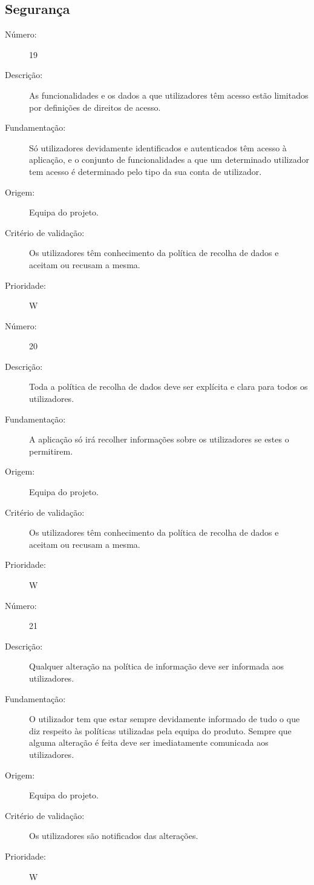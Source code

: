 \documentclass{article}
\begin{document}
  \subsection{Segurança}

            \begin{description}
        \item[Número:]19
        \item[Descrição:]As funcionalidades e os dados a que utilizadores têm acesso estão limitados por definições de direitos de acesso.
        \item[Fundamentação:]Só utilizadores devidamente identificados e autenticados têm acesso à aplicação, e o conjunto de funcionalidades a que um determinado utilizador tem acesso é determinado pelo tipo da sua conta de utilizador.
        \item[Origem:]Equipa do projeto.
        \item[Critério de validação:]Os utilizadores têm conhecimento da política de recolha de dados e aceitam ou recusam a mesma.
        \item[Prioridade:]W
      \end{description}
      \vspace{0.5cm}

            \begin{description}
        \item[Número:]20
        \item[Descrição:]Toda a política de recolha de dados deve ser explícita e clara para todos os utilizadores.
        \item[Fundamentação:]A aplicação só irá recolher informações sobre os utilizadores se estes o permitirem.
        \item[Origem:]Equipa do projeto.
        \item[Critério de validação:]Os utilizadores têm conhecimento da política de recolha de dados e aceitam ou recusam a mesma.
        \item[Prioridade:]W
      \end{description}
      \vspace{0.5cm}

            \begin{description}
        \item[Número:]21
        \item[Descrição:]Qualquer alteração na política de informação deve ser informada aos utilizadores. 
        \item[Fundamentação:]O utilizador tem que estar sempre devidamente informado de tudo o que diz respeito às políticas utilizadas pela equipa do produto. Sempre que alguma alteração é feita deve ser imediatamente comunicada aos utilizadores.
        \item[Origem:] Equipa do projeto.
        \item[Critério de validação:]Os utilizadores são notificados das alterações.
        \item[Prioridade:]W
      \end{description}
      \vspace{0.5cm}
\end{document}
